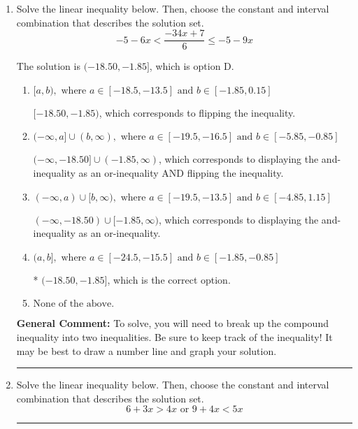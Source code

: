 \documentclass{extbook}[14pt]
\newcommand{\litem}[1]{\item #1

\rule{\textwidth}{0.4pt}}
\begin{document}
\begin{enumerate}
{\begin{enumerate}[label=\Alph*.]
 * Correct option.
\item \( (-\infty, a) \cup (b, \infty), \text{ where } a \in [-3.8, -2.7] \text{ and } b \in [1.66, 2.69] \)

Corresponds to inverting the inequality and negating the solution.
\item \( (-\infty, a] \cup [b, \infty), \text{ where } a \in [-2.78, -1.68] \text{ and } b \in [2.4, 3.3] \)

Corresponds to including the endpoints (when they should be excluded).
\item \( (-\infty, \infty) \)

Corresponds to the variable canceling, which does not happen in this instance.
\end{enumerate}

\textbf{General Comment:} When multiplying or dividing by a negative, flip the sign.
}
\litem{
Solve the linear inequality below. Then, choose the constant and interval combination that describes the solution set.
\[ -5 - 6 x < \frac{-34 x + 7}{6} \leq -5 - 9 x \]

The solution is \( (-18.50, -1.85] \), which is option D.\begin{enumerate}[label=\Alph*.]
\item \( [a, b), \text{ where } a \in [-18.5, -13.5] \text{ and } b \in [-1.85, 0.15] \)

$[-18.50, -1.85)$, which corresponds to flipping the inequality.
\item \( (-\infty, a] \cup (b, \infty), \text{ where } a \in [-19.5, -16.5] \text{ and } b \in [-5.85, -0.85] \)

$(-\infty, -18.50] \cup (-1.85, \infty)$, which corresponds to displaying the and-inequality as an or-inequality AND flipping the inequality.
\item \( (-\infty, a) \cup [b, \infty), \text{ where } a \in [-19.5, -13.5] \text{ and } b \in [-4.85, 1.15] \)

$(-\infty, -18.50) \cup [-1.85, \infty)$, which corresponds to displaying the and-inequality as an or-inequality.
\item \( (a, b], \text{ where } a \in [-24.5, -15.5] \text{ and } b \in [-1.85, -0.85] \)

* $(-18.50, -1.85]$, which is the correct option.
\item \( \text{None of the above.} \)


\end{enumerate}

\textbf{General Comment:} To solve, you will need to break up the compound inequality into two inequalities. Be sure to keep track of the inequality! It may be best to draw a number line and graph your solution.
}
\litem{
Solve the linear inequality below. Then, choose the constant and interval combination that describes the solution set.
\[ 6 + 3 x > 4 x \text{ or } 9 + 4 x < 5 x \]

}
\end{enumerate}
\end{document}
